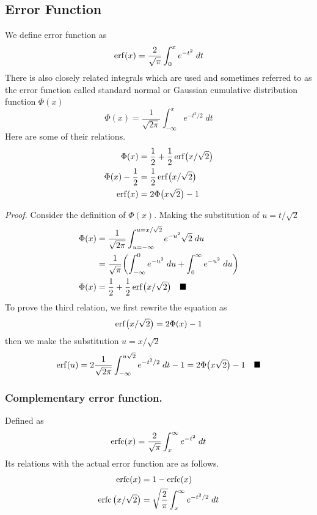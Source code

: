 \documentclass[../main.tex]{subfiles}
\begin{document}
\subsection*{Error Function} We define error function as 
\begin{equation*}
    \operatorname{erf}(x)=\frac{2}{\sqrt{\pi}}\int_{0}^{x}e^{-t^2}\;dt
\end{equation*}
There is also closely related integrals which are used and sometimes referred to as the error function called standard normal or Gaussian cumulative distribution function $\Phi(x)$
\begin{equation*}
    \Phi(x)=\frac{1}{\sqrt{2\pi}}\int_{-\infty}^{x} e^{-t^2/2}\;dt
\end{equation*}
Here are some of their relations.
\begin{align*}
    \Phi(x)&=\frac{1}{2}+\frac{1}{2}\operatorname{erf}\bigl(x/\sqrt{2}\bigr)\\
    \Phi(x)-\frac{1}{2}&=\frac{1}{2}\operatorname{erf}\bigl(x/\sqrt{2}\bigr)\\
    \operatorname{erf}(x)&=2\Phi\bigl(x\sqrt{2}\bigr)-1
\end{align*}

\emph{Proof.} Consider the definition of $\Phi(x)$. Making the substitution of $u=t/\sqrt{2}$
\begin{align*}
    \Phi(x)&=\frac{1}{\sqrt{2\pi}}\int_{u=-\infty}^{u=x/\sqrt{2}}e^{-u^2}\sqrt{2}\;du\\
    &=\frac{1}{\sqrt{\pi}} \biggl(\int_{-\infty}^{0}e^{-u^2}\;du+ \int_{0}^{\infty}e^{-u^2}\;du\biggr)\\
    \Phi(x)&=\frac{1}{2}+\frac{1}{2}\operatorname{erf}\bigl(x/\sqrt{2}\bigr)\quad\blacksquare
\end{align*}
To prove the third relation, we first rewrite the equation as
\begin{align*}
    \operatorname{erf}\bigl(x/\sqrt{2}\bigr)= 2\Phi(x)-1
\end{align*}
then we make the substitution $u=x/\sqrt{2}$
\begin{align*}
    \operatorname{erf}(u)= 2\frac{1}{\sqrt{2\pi}}\int_{-\infty}^{u\sqrt{2}} e^{-t^2/2}\;dt-1=2\Phi\bigl(x\sqrt{2}\bigr)-1\quad\blacksquare
\end{align*}

\subsubsection*{Complementary error function.} Defined as 
\begin{equation*}
    \operatorname{erfc}(x)=\frac{2}{\sqrt{\pi}}\int_{x}^{\infty}e^{-t^2}\;dt
\end{equation*}
Its relations with the actual error function are as follows.
\begin{align*}
    \operatorname{erfc}(x)&=1-\operatorname{erfc}(x)\\
    \operatorname{erfc}\big(x/\sqrt{2}\big)&=\sqrt{\frac{2}{\pi}}\int_{x}^{\infty}e^{-t^2/2}\;dt
\end{align*}
\end{document}
